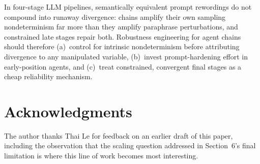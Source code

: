 \documentclass[11pt]{article}
\begin{document}
In four-stage LLM pipelines, semantically equivalent prompt rewordings do
not compound into runaway divergence: chains amplify their own sampling
nondeterminism far more than they amplify paraphrase perturbations, and
constrained late stages repair both. Robustness engineering for agent chains
should therefore (a)~control for intrinsic nondeterminism before attributing
divergence to any manipulated variable, (b)~invest prompt-hardening effort
in early-position agents, and (c)~treat constrained, convergent final stages
as a cheap reliability mechanism.

\section*{Acknowledgments}

The author thanks Thai Le for feedback on an earlier draft of this paper,
including the observation that the scaling question addressed in
Section~6's final limitation is where this line of work becomes most
interesting.
\end{document}

